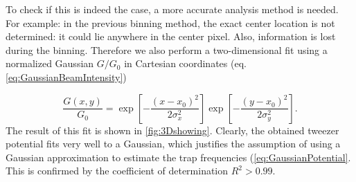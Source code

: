 To check if this is indeed the case, a more accurate analysis method is needed.
For example: in the previous binning method, the exact center location is not determined: it could lie anywhere in the center pixel. 
Also, information is lost during the binning. 
Therefore we also perform a two-dimensional fit using a normalized Gaussian $G/G_0$ in Cartesian coordinates (eq. \ref{eq:GaussianBeamIntensity})

\begin{equation}\label{eq:2DGaussian}
    \frac{G(x,y)}{G_0} =  
    \exp{\left[ -\frac{(x-x_0)^2}{2\sigma_x^2}\right]}
    \exp{\left[ -\frac{(y-x_0)^2}{2\sigma_y^2}\right]}.
\end{equation}
The result of this fit is shown in \cref{fig:3Dshowing}. 
Clearly, the obtained tweezer potential fits very well to a Gaussian, which justifies the assumption of using a Gaussian approximation to estimate the trap frequencies (\cref{eq:GaussianPotential}. 
This is confirmed by the coefficient of determination $R^2 > 0.99$.

